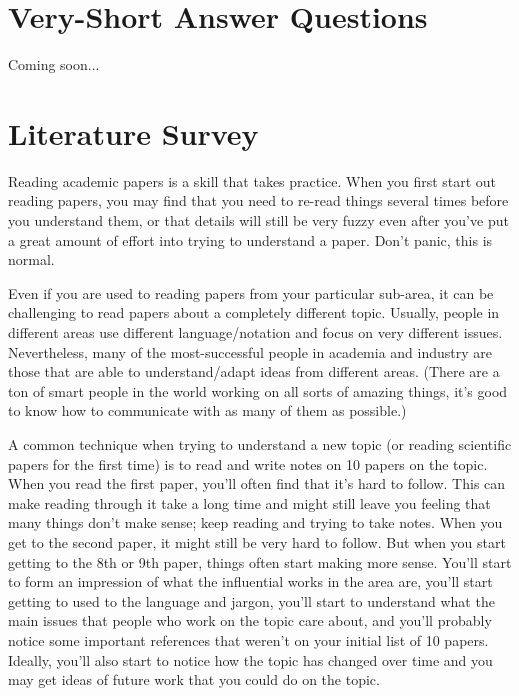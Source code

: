 \documentclass{article}
\begin{document}
\section{Very-Short Answer Questions}

Coming soon...


\section{Literature Survey}

Reading academic papers is a skill that takes practice. When you first start out reading papers, you may find that you need to re-read things several times before you understand them, or that details will still be very fuzzy even after you've put a great amount of effort into trying to understand a paper. Don't panic, this is normal.

Even if you are used to reading papers from your particular sub-area, it can be challenging to read papers about a completely different topic. Usually, people in different areas use different language/notation and focus on very different issues. Nevertheless, many of the most-successful people in academia and industry are those that are able to understand/adapt ideas from different areas. (There are a ton of smart people in the world working on all sorts of amazing things, it's good to know how to communicate with as many of them as possible.)

A common technique when trying to understand a new topic (or reading scientific papers for the first time) is to read and write notes on 10 papers on the topic. When you read the first paper, you'll often find that it's hard to follow. This can make reading through it take a long time and might still leave you feeling that many things don't make sense; keep reading and trying to take notes. When you get to the second paper, it might still be very hard to follow. But when you start getting to the 8th or 9th paper, things often start making more sense. You'll start to form an impression of what the influential works in the area are, you'll start getting to used to the language and jargon, you'll start to understand what the main issues that people who work on the topic care about, and you'll probably notice some important references that weren't on your initial list of 10 papers. Ideally, you'll also start to notice how the topic has changed over time and you may get  ideas of future work that you could do on the topic.
\end{document}
